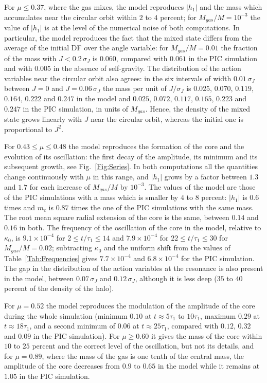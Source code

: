 \documentclass[prd,aps,nofootinbib,superscriptaddress,amsmath,amssymb]{revtex4}
\begin{document}
For $\mu\leq 0.37$, where the gas mixes, the model reproduces $|h_1|$ and the mass which accumulates near the circular orbit within $2$ to $4$ percent; for $M_{gas}/M = 10^{-3}$ the value of $|h_1|$ is at the level of the numerical noise of both computations. In particular, the model reproduces the fact that the mixed state differs from the average of the initial DF over the angle variable: for $M_{gas}/M = 0.01$ the fraction of the mass with $J < 0.2\,\sigma_J$ is $0.060$, compared with $0.061$ in the PIC simulation and with $0.005$ in the absence of self-gravity. The distribution of the action variables near the circular orbit also agrees: in the six intervals of width $0.01\,\sigma_J$ between $J = 0$ and $J = 0.06\,\sigma_J$ the mass per unit of $J/\sigma_J$ is $0.025$, $0.070$, $0.119$, $0.164$, $0.222$ and $0.247$ in the model and $0.025$, $0.072$, $0.117$, $0.165$, $0.223$ and $0.247$ in the PIC simulation, in units of $M_{gas}$. Hence, the density of the mixed state grows linearly with $J$ near the circular orbit, whereas the initial one is proportional to $J^2$.

For $0.43\leq\mu\leq 0.48$ the model reproduces the formation of the core and the evolution of its oscillation: the first decay of the amplitude, its minimum and its subsequent growth, see Fig.~\ref{Fig:Series}. In both computations all the quantities change continuously with $\mu$ in this range, and $|h_1|$ grows by a factor between $1.3$ and $1.7$ for each increase of $M_{gas}/M$ by $10^{-3}$. The values of the model are those of the PIC simulations with a mass which is smaller by $4$ to $8$ percent: $|h_1|$ is $0.6$ times and $m_c$ is $0.87$ times the one of the PIC simulations with the same mass. The root mean square radial extension of the core is the same, between $0.14$ and $0.16$ in both. The frequency of the oscillation of the core in the model, relative to $\kappa_0$, is $9.1\times 10^{-4}$ for $2\leq t/\tau_1\leq 14$ and $7.9\times 10^{-4}$ for $22\leq t/\tau_1\leq 30$ for $M_{gas}/M = 0.02$; subtracting $\kappa_0$ and the uniform shift from the values of Table~\ref{Tab:Frequencies} gives $7.7\times 10^{-4}$ and $6.8\times 10^{-4}$ for the PIC simulation. The gap in the distribution of the action variables at the resonance is also present in the model, between $0.07\,\sigma_J$ and $0.12\,\sigma_J$, although it is less deep ($35$ to $40$ percent of the density of the halo).

For $\mu = 0.52$ the model reproduces the modulation of the amplitude of the core during the whole simulation (minimum $0.10$ at $t\approx 5\tau_1$ to $10\tau_1$, maximum $0.29$ at $t\approx 18\tau_1$, and a second minimum of $0.06$ at $t\approx 25\tau_1$, compared with $0.12$, $0.32$ and $0.09$ in the PIC simulation). For $\mu\geq 0.60$ it gives the mass of the core within $10$ to $25$ percent and the correct level of the oscillation, but not its details, and for $\mu = 0.89$, where the mass of the gas is one tenth of the central mass, the amplitude of the core decreases from $0.9$ to $0.65$ in the model while it remains at $1.05$ in the PIC simulation.
\end{document}
